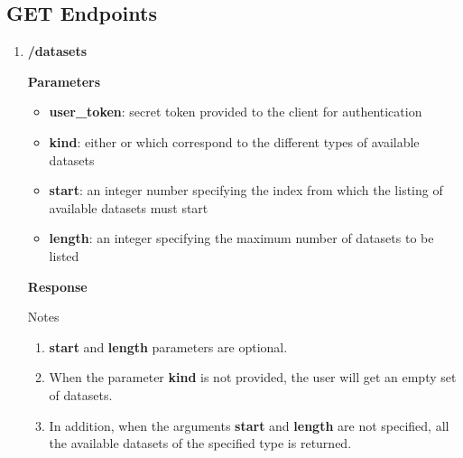 \documentclass[a4paper,10pt]{scrartcl}
\begin{document}
\subsection{GET Endpoints}
\begin{enumerate}
 \item \textbf{/datasets}
\textbf{Parameters}
\begin{itemize}
\item \textbf{user\_token}: secret token provided to the client for authentication
\item \textbf{kind}: either  or  which correspond to the different types of available datasets
\item \textbf{start}: an integer number specifying the index from which the listing of available datasets must start 
\item \textbf{length}: an integer specifying the maximum number of datasets to be listed
\end{itemize}
\textbf{Response}
\textsf{Notes}
\begin{enumerate}
 \item \textbf{start} and \textbf{length} parameters are optional. 
 \item When the parameter \textbf{kind} is not provided, the user will get an empty 
 set of datasets. 
 \item In addition, when the arguments \textbf{start} and \textbf{length} 
 are not specified, all the available datasets of the specified type is returned.
\end{enumerate}


\end{enumerate}
\end{document}
